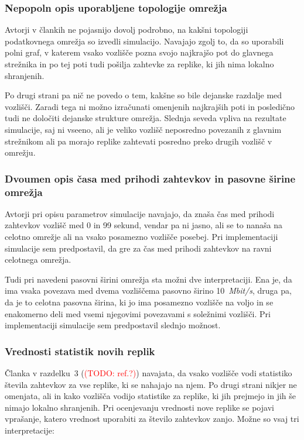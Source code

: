 \documentclass[a4paper, 12pt]{book}
\newcommand{\TODO}[1]{\textcolor{red}{(TODO: #1)}}
\begin{document}
\subsubsection{Nepopoln opis uporabljene topologije omrežja}

Avtorji v člankih ne pojasnijo dovolj podrobno, na kakšni topologiji
podatkovnega omrežja so izvedli simulacijo. Navajajo zgolj to, da so uporabili
polni graf, v katerem vsako vozlišče pozna svojo najkrajšo pot do glavnega
strežnika in po tej poti tudi pošilja zahtevke za replike, ki jih nima lokalno
shranjenih.

Po drugi strani pa nič ne povedo o tem, kakšne so bile dejanske
razdalje med vozlišči. Zaradi tega ni možno izračunati omenjenih
najkrajših poti in posledično tudi ne določiti dejanske strukture omrežja.
Slednja seveda vpliva na rezultate simulacije, saj ni vseeno, ali je veliko
vozlišč neposredno povezanih z glavnim strežnikom ali pa morajo replike
zahtevati posredno preko drugih vozlišč v omrežju.

\subsubsection{Dvoumen opis časa med prihodi zahtevkov in pasovne širine
omrežja}

Avtorji pri opisu parametrov simulacije navajajo, da znaša čas med prihodi
zahtevkov vozlišč med 0 in 99 sekund, vendar pa ni jasno, ali se to nanaša
na celotno omrežje ali na vsako posamezno vozlišče posebej. Pri implementaciji
simulacije sem predpostavil, da gre za čas med prihodi zahtevkov na ravni
celotnega omrežja.

Tudi pri navedeni pasovni širini omrežja sta možni dve interpretaciji. Ena je,
da ima vsaka povezava med dvema vozliščema pasovno širino 10~\textit{Mbit/s},
druga pa, da je to celotna pasovna širina, ki jo ima posamezno vozlišče na
voljo in se enakomerno deli med vsemi njegovimi povezavami s soležnimi
vozlišči. Pri implementaciji simulacije sem predpostavil slednjo možnost.

\subsubsection{Vrednosti statistik novih replik}

Članka v razdelku~3 (\TODO{ref.?}) navajata, da vsako vozlišče vodi statistiko
števila zahtevkov za vse replike, ki se nahajajo na njem. Po drugi strani
nikjer ne omenjata, ali in kako vozlišča vodijo statistike za replike, ki jih
prejmejo in jih še nimajo lokalno shranjenih.
Pri ocenjevanju vrednosti nove replike se pojavi vprašanje, katero vrednost
uporabiti za število zahtevkov zanjo. Možne so vsaj tri interpretacije:
\end{document}
